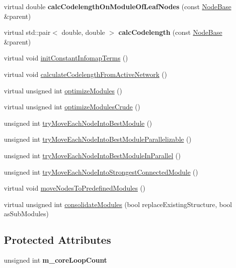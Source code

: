 \begin{DoxyCompactItemize}
virtual double {\bfseries calc\+Codelength\+On\+Module\+Of\+Leaf\+Nodes} (const \mbox{\hyperlink{classNodeBase}{Node\+Base}} \&parent)
\item 
\mbox{\label{classInfomapGreedyCommon_a912810e1dba306751dacd82acddf373a}} 
virtual std\+::pair$<$ double, double $>$ {\bfseries calc\+Codelength} (const \mbox{\hyperlink{classNodeBase}{Node\+Base}} \&parent)
\item 
virtual void \mbox{\hyperlink{classInfomapGreedyCommon_af6135849730a24a4f3fea57ff32991e5}{init\+Constant\+Infomap\+Terms}} ()
\item 
virtual void \mbox{\hyperlink{classInfomapGreedyCommon_ae168ab41c18759e09b1a3dff97ee017d}{calculate\+Codelength\+From\+Active\+Network}} ()
\item 
virtual unsigned int \mbox{\hyperlink{classInfomapGreedyCommon_a17feb30bfa3d448f7933c3fcc237f833}{optimize\+Modules}} ()
\item 
virtual unsigned int \mbox{\hyperlink{classInfomapGreedyCommon_a3b5e71572ae01ce0788f919290903b63}{optimize\+Modules\+Crude}} ()
\item 
unsigned int \mbox{\hyperlink{classInfomapGreedyCommon_a25af363aae49138b379a823b6ab2ad5c}{try\+Move\+Each\+Node\+Into\+Best\+Module}} ()
\item 
unsigned int \mbox{\hyperlink{classInfomapGreedyCommon_a5d0eb8fd059c6d308c53f8c4ed8f10f9}{try\+Move\+Each\+Node\+Into\+Best\+Module\+Parallelizable}} ()
\item 
unsigned int \mbox{\hyperlink{classInfomapGreedyCommon_aebf032fcd793b9496e5b1952cb14c233}{try\+Move\+Each\+Node\+Into\+Best\+Module\+In\+Parallel}} ()
\item 
unsigned int \mbox{\hyperlink{classInfomapGreedyCommon_ac1026d8aaeb5a5ceeb6c272d6adba431}{try\+Move\+Each\+Node\+Into\+Strongest\+Connected\+Module}} ()
\item 
virtual void \mbox{\hyperlink{classInfomapGreedyCommon_affbdd4750e010adba7f1cd15a295303e}{move\+Nodes\+To\+Predefined\+Modules}} ()
\item 
virtual unsigned int \mbox{\hyperlink{classInfomapGreedyCommon_ad4845dbd57d006f5220e6a7d9f293f9d}{consolidate\+Modules}} (bool replace\+Existing\+Structure, bool as\+Sub\+Modules)
\end{DoxyCompactItemize}
\subsection*{Protected Attributes}
\begin{DoxyCompactItemize}
\item 
\mbox{\label{classInfomapGreedyCommon_aca47c78ffb35ca1a504ee5ed811adce4}} 
unsigned int {\bfseries m\+\_\+core\+Loop\+Count}
\end{DoxyCompactItemize}
